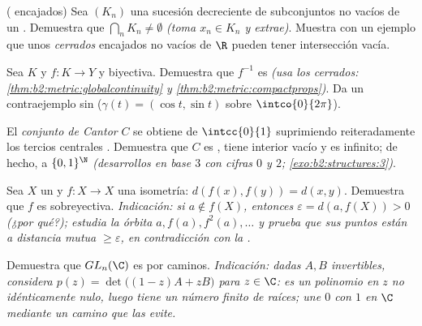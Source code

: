 \begin{exercise}[$\star\star$]\label{exo:b2:metric:6}
( encajados) Sea $(K_n)$ una sucesión decreciente de
subconjuntos  no vacíos de un . Demuestra
que $\bigcap_n K_n \neq \emptyset$ \emph{(toma $x_n \in K_n$ y
extrae)}. Muestra con un ejemplo que unos \emph{cerrados} encajados
no vacíos de $\R$ pueden tener intersección vacía.
\end{exercise}

\begin{exercise}[$\star\star$]\label{exo:b2:metric:7}
Sea $K$  y $f \colon K \to Y$  y biyectiva.
Demuestra que $f^{-1}$ es  \emph{(usa los cerrados:
\cref{thm:b2:metric:globalcontinuity} y
\cref{thm:b2:metric:compactprops})}. Da un contraejemplo sin
 ($\gamma(t) = (\cos t, \sin t)$ sobre
$\intco{0}{2\pi}$).
\end{exercise}

\begin{exercise}[$\star\star$]\label{exo:b2:metric:8}
El \emph{conjunto de Cantor} $C$ se obtiene de $\intcc{0}{1}$
suprimiendo reiteradamente los tercios centrales . Demuestra
que $C$ es , tiene interior vacío y es infinito; de hecho,
 a $\{0,1\}^{\N}$ \emph{(desarrollos en base $3$ con
cifras $0$ y $2$; \cref{exo:b2:structures:3})}.
\end{exercise}

\begin{exercise}[$\star\star\star$]\label{exo:b2:metric:9}
Sea $X$ un  \emph{} y $f \colon X \to X$ una
isometría: $d(f(x), f(y)) = d(x, y)$. Demuestra que $f$ es
sobreyectiva. \emph{Indicación: si $a \notin f(X)$, entonces
$\varepsilon = d(a, f(X)) > 0$ (¿por qué?); estudia la órbita $a,
f(a), f^2(a), \dots$ y prueba que sus puntos están a distancia mutua
$\geq \varepsilon$, en contradicción con la .}
\end{exercise}

\begin{exercise}[$\star\star\star$]\label{exo:b2:metric:10}
Demuestra que $GL_n(\C)$ es  por caminos. \emph{Indicación:
dadas $A, B$ invertibles, considera $p(z) = \det\bigl((1 - z)A +
zB\bigr)$ para $z \in \C$: es un polinomio en $z$ no idénticamente
nulo, luego tiene un número finito de raíces; une $0$ con $1$ en $\C$
mediante un camino que las evite.}
\end{exercise}

